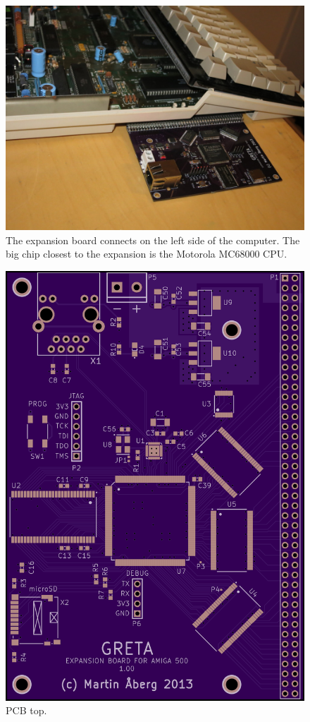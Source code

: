 \documentclass[a4paper]{report}
\begin{document}
\begin{figure}
\centering
\includegraphics[width=\textwidth]{greta_connected2.jpg}
\caption{The expansion board connects on the left side of the
computer. The big chip closest to the expansion is the Motorola
MC68000 CPU.}
\label{greta_connected2}
\end{figure}

\begin{figure}
\centering
\includegraphics[width=\textwidth]{greta_1_00_top.png}
\caption{PCB top.}
\label{greta_osh_top}
\end{figure}
\end{document}
